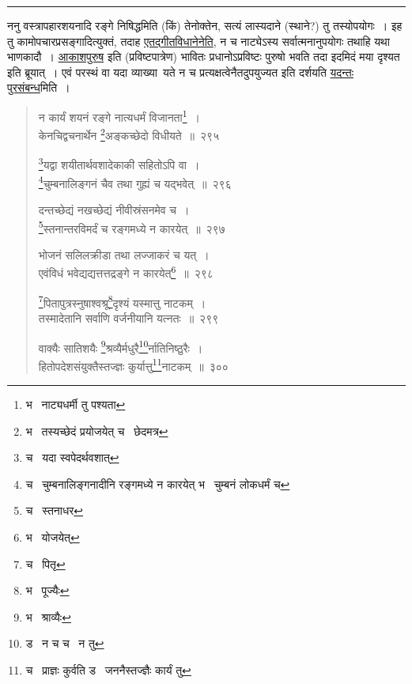 \documentclass[11pt, openany]{book}
\begin{document}
\hrule

\vspace{2mm}
\begin{sloppypar}
ननु वस्त्रापहारशयनादि रङ्गे निषिद्धमिति (किं) तेनोक्तेन, सत्यं लास्यदाने (स्थाने?) तु तस्योपयोगः~। इह तु कामोपचारप्रसङ्गादित्युक्तं, तदाह \underline{एतद्गीतविधानेनेति}, न च नाट्येऽस्य सर्वात्मनानुपयोगः तथाहि यथा भाणकादौ~। \underline{आकाशपुरुष} इति (प्रविष्टपात्रेण) भावितः प्रधानोऽप्रविष्टः पुरुषो भवति तदा इदमिदं मया दृश्यत इति ब्रूयात्~। एवं परस्थं वा यदा व्याख्या\textendash\ यते न च प्रत्यक्षत्वेनैतदुपयुज्यत इति दर्शयति \underline{यदन्तः पुरसंबन्ध}मिति~। 
\end{sloppypar}

\newpage

\begin{quote}
{\na न कार्यं शयनं रङ्गे नात्यधर्मं विजानता\renewcommand{\thefootnote}{1}\footnote{भ \textendash\  नाट्यधर्मी तु पश्यता}~।\\
केनचिद्वचनार्थेन \renewcommand{\thefootnote}{2}\footnote{भ \textendash\  तस्यच्छेदं प्रयोजयेत् च \textendash\  छेदमत्र}अङ्कच्छेदो विधीयते~॥~२९५ 

\renewcommand{\thefootnote}{3}\footnote{च \textendash\  यदा स्वपेदर्थवशात्}यद्वा शयीतार्थवशादेकाकी सहितोऽपि वा~।\\
\renewcommand{\thefootnote}{4}\footnote{च \textendash\  चुम्बनालिङ्गनादीनि रङ्गमध्ये न कारयेत् भ \textendash\  चुम्बनं लोकधर्मं च}चुम्बनालिङ्गनं चैव तथा गुह्यं च यद्भवेत्~॥~२९६ 

दन्तच्छेद्यं नखच्छेद्यं नीवीस्रंसनमेव च~। \\
\renewcommand{\thefootnote}{5}\footnote{च \textendash\  स्तनाधर}स्तनान्तरविमर्दं च रङ्गमध्ये न कारयेत्~॥~२९७ 

भोजनं सलिलक्रीडा तथा लज्जाकरं च यत्~।\\
एवंविधं भवेद्यद्यत्तत्तद्रङ्गे न कारयेत्\renewcommand{\thefootnote}{6}\footnote{भ \textendash\  योजयेत्}~॥~२९८ 

\renewcommand{\thefootnote}{7}\footnote{च \textendash\  पितृ}पितापुत्रस्नुषाश्वश्रू\renewcommand{\thefootnote}{8}\footnote{भ \textendash\  पूज्यैः}दृश्यं यस्मात्तु नाटकम्~। \\
तस्मादेतानि सर्वाणि वर्जनीयानि यत्नतः~॥~२९९ 

वाक्यैः सातिशयैः \renewcommand{\thefootnote}{9}\footnote{भ \textendash\  श्राव्यैः}श्रव्यैर्मधुरै\renewcommand{\thefootnote}{10}\footnote{ड \textendash\  न च च \textendash\  न तु}र्नातिनिष्ठुरैः~। \\
हितोपदेशसंयुक्तैस्तज्ज्ञः कुर्यात्तु\renewcommand{\thefootnote}{11}\footnote{च \textendash\  प्राज्ञः कुर्वति ड \textendash\  जननैस्तज्ज्ञैः कार्यं तु}नाटकम्~॥~३००}
\end{quote}
\end{document}

